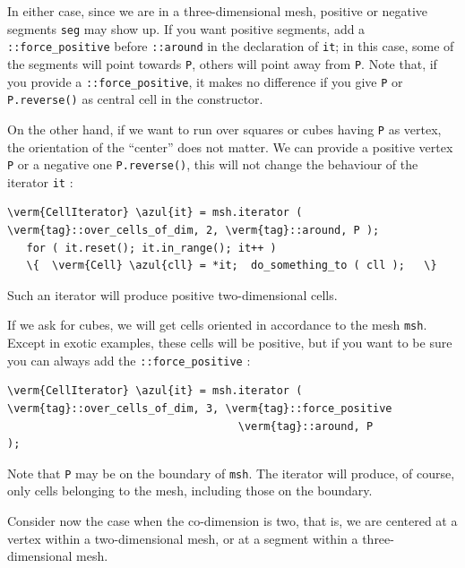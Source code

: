In either case, since we are in a three-dimensional mesh, positive or negative segments
{\small\tt seg} may show up.
If you want positive segments, add a {\small\tt{}::force\_positive} before
{\small\tt{}::around} in the declaration of {\small\tt it};
in this case, some of the segments will point towards {\small\tt P},
others will point away from {\small\tt P}.
Note that, if you provide a {\small\tt{}::force\_positive}, it makes no difference
if you give {\small\tt P} or {\small\tt P.reverse()} as central cell in the constructor.

On the other hand, if we want to run over squares or cubes having {\small\tt P} as vertex,
the orientation of the ``center'' does not matter.
We can provide a positive vertex {\small\tt P} or a negative one {\small\tt P.reverse()},
this will not change the behaviour of the iterator {\small\tt it} :

\begin{Verbatim}[commandchars=\\\{\},formatcom=\small\tt,
   baselinestretch=0.94,framesep=2mm                      ]
   \verm{CellIterator} \azul{it} = msh.iterator ( \verm{tag}::over_cells_of_dim, 2, \verm{tag}::around, P );
   for ( it.reset(); it.in_range(); it++ )
   \{  \verm{Cell} \azul{cll} = *it;  do_something_to ( cll );   \}
\end{Verbatim}

Such an iterator will produce positive two-dimensional cells.

If we ask for cubes, we will get cells oriented in accordance to the mesh {\small\tt msh}.
Except in exotic examples, these cells will be positive, but if you want to be sure you
can always add the {\small\tt{}::force\_positive} :

\begin{Verbatim}[commandchars=\\\{\},formatcom=\small\tt,
   baselinestretch=0.94,framesep=2mm                      ]
   \verm{CellIterator} \azul{it} = msh.iterator ( \verm{tag}::over_cells_of_dim, 3, \verm{tag}::force_positive
                                    \verm{tag}::around, P                                 );
\end{Verbatim}

Note that {\small\tt P} may be on the boundary of {\small\tt msh}.
The iterator will produce, of course, only cells belonging to the mesh, including those
on the boundary.

Consider now the case when the co-dimension is two, that is, we are centered at a vertex
within a two-dimensional mesh, or at a segment within a three-dimensional mesh.

